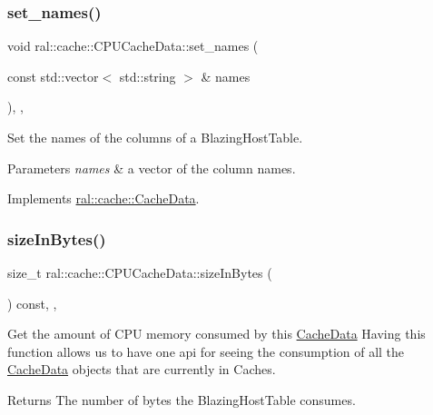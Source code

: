 \subsubsection{\texorpdfstring{set\+\_\+names()}{set\_names()}}
{\footnotesize\ttfamily void ral\+::cache\+::\+C\+P\+U\+Cache\+Data\+::set\+\_\+names (\begin{DoxyParamCaption}\item[{const std\+::vector$<$ std\+::string $>$ \&}]{names }\end{DoxyParamCaption})\hspace{0.3cm}{\ttfamily [inline]}, {\ttfamily [override]}, {\ttfamily [virtual]}}

Set the names of the columns of a Blazing\+Host\+Table. 
\begin{DoxyParams}{Parameters}
{\em names} & a vector of the column names. \\
\hline
\end{DoxyParams}


Implements \hyperlink{classral_1_1cache_1_1CacheData_a3bb1623a4266ba7c961d325023ff13c6}{ral\+::cache\+::\+Cache\+Data}.

\mbox{\label{classral_1_1cache_1_1CPUCacheData_a83236d09b1d2341059d1a6738839d35c}} 
\subsubsection{\texorpdfstring{size\+In\+Bytes()}{sizeInBytes()}}
{\footnotesize\ttfamily size\+\_\+t ral\+::cache\+::\+C\+P\+U\+Cache\+Data\+::size\+In\+Bytes (\begin{DoxyParamCaption}{ }\end{DoxyParamCaption}) const\hspace{0.3cm}{\ttfamily [inline]}, {\ttfamily [override]}, {\ttfamily [virtual]}}

Get the amount of C\+PU memory consumed by this \hyperlink{classral_1_1cache_1_1CacheData}{Cache\+Data} Having this function allows us to have one api for seeing the consumption of all the \hyperlink{classral_1_1cache_1_1CacheData}{Cache\+Data} objects that are currently in Caches. \begin{DoxyReturn}{Returns}
The number of bytes the Blazing\+Host\+Table consumes. 
\end{DoxyReturn}



